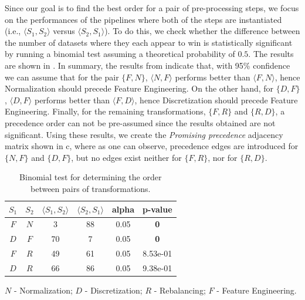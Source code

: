 Since our goal is to find the best order for a pair of pre-processing steps, we focus on the performances of the pipelines where both of the steps are instantiated (i.e., $\langle S_1, S_2 \rangle$ versus $\langle S_2, S_1 \rangle$).
To do this, we check whether the difference between the number of datasets where they each appear to win is statistically significant by running a binomial test assuming a theoretical probability of $0.5$.
The results are shown in .
In summary, the results from  indicate that, with 95\% confidence we can assume that for the pair $\{F, N\}$, $\langle N, F \rangle$ performs better than $\langle F, N \rangle$, hence Normalization should precede Feature Engineering.
On the other hand, for $\{D, F\}$, $\langle D, F \rangle$ performs better than $\langle F, D \rangle$, hence Discretization should precede Feature Engineering.
Finally, for the remaining transformations, $\{F, R\}$ and $\{R, D\}$, a precedence order can not be pre-assumed since the results obtained are not significant.
Using these results, we create the \textit{Promising precedence} adjacency matrix shown in c, where as one can observe, precedence edges are introduced for $\{N, F\}$ and $\{D, F\}$, but no edges exist neither for $\{F, R\}$, nor for $\{R, D\}$.




\begin{table}[t]
	\centering
	\footnotesize
	\begin{threeparttable}
		\caption{
			Binomial test for determining the order between pairs of transformations. 
		}
		\label{effective-tbl:significance-test}
		\begin{tabular}{@{}cccccc@{}}
			\toprule
			$S_1$ & $S_2$ & $\langle S_1, S_2 \rangle$ & $\langle S_2, S_1 \rangle$ & alpha & p-value\\ \midrule
			$F$ & $N$ & 3 & 88 & 0.05 &  \textbf{0} \\
			$D$ & $F$ & 70 & 7 & 0.05 &  \textbf{0}  \\
			$F$ & $R$ & 49 & 61 & 0.05 & 8.53e-01 \\
			$D$ & $R$ & 66 & 86 & 0.05 & 9.38e-01 \\ \bottomrule
		\end{tabular}
		\begin{tablenotes}
		\centering
		\scriptsize
		\item$N$ - Normalization; $D$ - Discretization; $R$ - Rebalancing; $F$ - Feature Engineering. 
		\end{tablenotes}
	\end{threeparttable}
\end{table}


